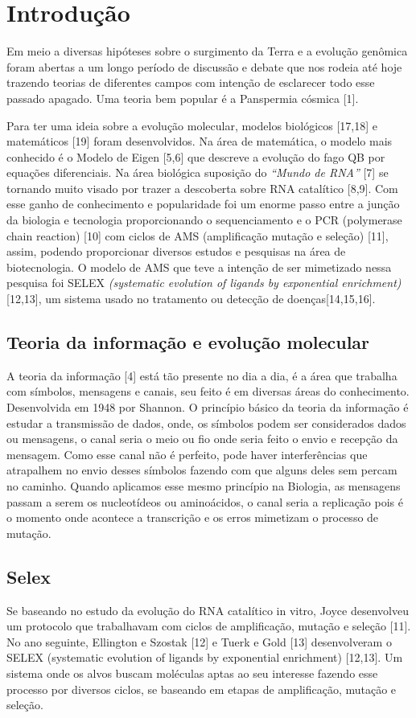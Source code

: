 \section{Introdução}

Em meio a diversas hipóteses sobre o surgimento da Terra e a evolução genômica
foram abertas a um longo período de discussão e debate que nos rodeia até hoje trazendo teorias de diferentes campos com intenção de esclarecer todo esse passado apagado. Uma teoria bem popular é a Panspermia cósmica [1]. 

Para ter uma ideia sobre a evolução molecular, modelos biológicos [17,18] e
matemáticos [19] foram desenvolvidos. Na área de matemática, o modelo mais conhecido é o Modelo de Eigen [5,6] que descreve a evolução do fago QB por equações diferenciais. Na área biológica suposição do \emph{“Mundo de RNA”} [7] se tornando muito visado por trazer a descoberta sobre RNA catalítico [8,9]. Com esse ganho de conhecimento e popularidade foi um enorme passo entre a junção da biologia e tecnologia proporcionando o sequenciamento e o PCR (polymerase chain reaction) [10] com ciclos de AMS (amplificação mutação e seleção) [11], assim, podendo proporcionar diversos estudos e pesquisas na área de biotecnologia. O modelo de AMS que teve a intenção de ser mimetizado nessa pesquisa foi SELEX \emph{(systematic evolution of ligands by exponential enrichment)} [12,13], um sistema usado no tratamento ou detecção de doenças[14,15,16].

\subsection{Teoria da informação e evolução molecular}
A teoria da informação [4] está tão presente no dia a dia, é a área que trabalha com símbolos, mensagens e canais, seu feito é em diversas áreas do conhecimento.
Desenvolvida em 1948 por Shannon. O princípio básico da teoria da informação é estudar a transmissão de dados, onde, os símbolos podem ser considerados dados ou mensagens, o canal seria o meio ou fio onde seria feito o envio e recepção da mensagem. Como esse canal não é perfeito, pode haver interferências que atrapalhem no envio desses símbolos fazendo com que alguns deles sem percam no caminho. Quando aplicamos esse mesmo princípio na Biologia, as mensagens passam a serem os nucleotídeos ou aminoácidos, o canal seria a replicação pois é o momento onde acontece a transcrição e os erros mimetizam o processo de mutação.

\subsection{Selex}
Se baseando no estudo da evolução do RNA catalítico in vitro, Joyce desenvolveu um
protocolo que trabalhavam com ciclos de amplificação, mutação e seleção [11]. No ano seguinte, Ellington e Szostak [12] e Tuerk e Gold [13] desenvolveram o SELEX
(systematic evolution of ligands by exponential enrichment) [12,13]. Um sistema onde os alvos buscam moléculas aptas ao seu interesse fazendo esse processo por diversos ciclos, se baseando em etapas de amplificação, mutação e seleção.

